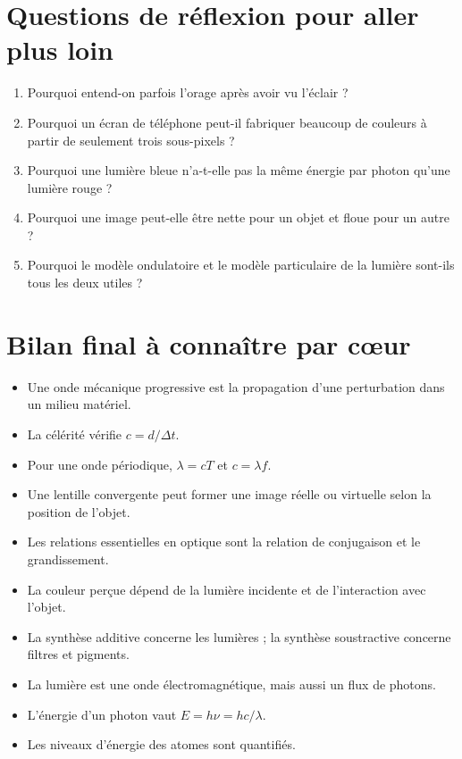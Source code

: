 \documentclass[11pt,a4paper]{article}
\begin{document}
\section{Questions de réflexion pour aller plus loin}
\begin{enumerate}[label=\arabic*.]
    \item Pourquoi entend-on parfois l'orage après avoir vu l'éclair ?
    \item Pourquoi un écran de téléphone peut-il fabriquer beaucoup de couleurs à partir de seulement trois sous-pixels ?
    \item Pourquoi une lumière bleue n'a-t-elle pas la même énergie par photon qu'une lumière rouge ?
    \item Pourquoi une image peut-elle être nette pour un objet et floue pour un autre ?
    \item Pourquoi le modèle ondulatoire et le modèle particulaire de la lumière sont-ils tous les deux utiles ?
\end{enumerate}

\section{Bilan final à connaître par cœur}
\begin{itemize}
    \item Une onde mécanique progressive est la propagation d'une perturbation dans un milieu matériel.
    \item La célérité vérifie $c=d/\Delta t$.
    \item Pour une onde périodique, $\lambda=cT$ et $c=\lambda f$.
    \item Une lentille convergente peut former une image réelle ou virtuelle selon la position de l'objet.
    \item Les relations essentielles en optique sont la relation de conjugaison et le grandissement.
    \item La couleur perçue dépend de la lumière incidente et de l'interaction avec l'objet.
    \item La synthèse additive concerne les lumières ; la synthèse soustractive concerne filtres et pigments.
    \item La lumière est une onde électromagnétique, mais aussi un flux de photons.
    \item L'énergie d'un photon vaut $E=h\nu=hc/\lambda$.
    \item Les niveaux d'énergie des atomes sont quantifiés.
\end{itemize}
\end{document}
